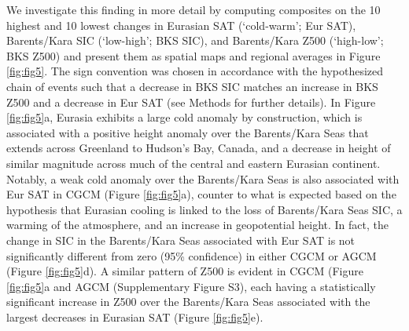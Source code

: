 \documentclass{nature}
\begin{document}

We investigate this finding in more detail by computing composites on the 10 highest and 10 lowest changes in Eurasian SAT (`cold-warm'; Eur SAT), Barents/Kara SIC (`low-high'; BKS SIC), and Barents/Kara Z500 (`high-low'; BKS Z500) and present them as spatial maps and regional averages in Figure \ref{fig:fig5}. The sign convention was chosen in accordance with the hypothesized chain of events such that a decrease in BKS SIC matches an increase in BKS Z500 and a decrease in Eur SAT (see Methods for further details). In Figure \ref{fig:fig5}a, Eurasia exhibits a large cold anomaly by construction, which is associated with a positive height anomaly over the Barents/Kara Seas that extends across Greenland to Hudson's Bay, Canada, and a decrease in height of similar magnitude across much of the central and eastern Eurasian continent. Notably, a weak cold anomaly over the Barents/Kara Seas is also associated with Eur SAT in CGCM (Figure \ref{fig:fig5}a), counter to what is expected based on the hypothesis that Eurasian cooling is linked to the loss of Barents/Kara Seas SIC, a warming of the atmosphere, and an increase in geopotential height. In fact, the change in SIC in the Barents/Kara Seas associated with Eur SAT is not significantly different from zero (95\% confidence) in either CGCM or AGCM (Figure \ref{fig:fig5}d). A similar pattern of Z500 is evident in CGCM (Figure \ref{fig:fig5}a and AGCM (Supplementary Figure S3), each having a statistically significant increase in Z500 over the Barents/Kara Seas associated with the largest decreases in Eurasian SAT (Figure \ref{fig:fig5}e). %
\end{document}
